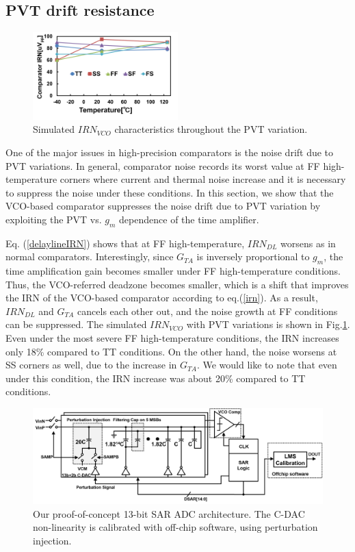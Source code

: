 \documentclass[journal]{IEEEtran}
\begin{document}
\subsection{PVT drift resistance}
\begin{figure}[ht!]
\centering
 \includegraphics[width=0.5\textwidth]{figs/pvt_vco.png}
  \caption{Simulated $IRN_{VCO}$ characteristics throughout the PVT variation.}
  \label{pvtvco}
\end{figure}

One of the major issues in high-precision comparators is the noise drift due to PVT variations. In general, comparator noise records its worst value at  FF high-temperature corners where current and thermal noise increase and it is necessary to suppress the noise under these conditions. In this section, we show that the VCO-based comparator suppresses the noise drift due to PVT variation by exploiting the PVT vs. $g_m$ dependence of the time amplifier.

Eq. (\ref{delaylineIRN}) shows that at FF high-temperature, $IRN_{DL}$ worsens as in normal comparators.
Interestingly, since $G_{TA}$ is inversely proportional to $g_m$, the time amplification gain becomes smaller under FF high-temperature conditions. Thus, the VCO-referred deadzone becomes smaller, which is a shift that improves the IRN of the VCO-based comparator according to eq.(\ref{irn}). As a result, $IRN_{DL}$ and $G_{TA}$ cancels each other out, and the noise growth at FF conditions can be suppressed. The simulated $IRN_{VCO}$ with PVT variations is shown in Fig.\ref{pvtvco}. Even under the most severe FF high-temperature conditions, the IRN increases only 18\% compared to TT conditions. On the other hand, the noise worsens at SS corners as well, due to the increase in $G_{TA}$. We would like to note that even under this condition, the IRN increase was about 20\% compared to TT conditions.

\begin{figure}[!]
\centering
 \includegraphics[width=1\textwidth]{figs/fig7.png}
  \caption{Our proof-of-concept 13-bit SAR ADC architecture. The C-DAC non-linearity is calibrated with off-chip software, using perturbation injection\cite{liu201012b}.}
  \label{13bsar}
\end{figure}
\end{document}
